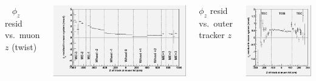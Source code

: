\documentclass[compress]{beamer}
\begin{document}
\begin{frame}
\vspace{0.1 cm}
\begin{columns}
\scriptsize \mbox{ } \hfill $\phi_z$ resid vs.\ muon $z$ (twist) \hfill \mbox{ }

\includegraphics[width=\linewidth]{phiresid_from_muon.png}

\scriptsize $\phi_z$ resid vs.\ outer tracker $z$

\includegraphics[width=\linewidth]{phiresid_from_tracker_outer.png}
\end{columns}
\end{frame}
\end{document}

